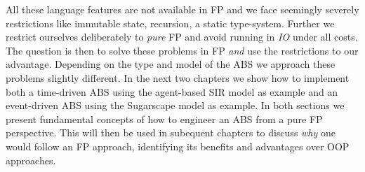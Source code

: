 All these language features are not available in FP and we face seemingly severely restrictions like immutable state, recursion, a static type-system. Further we restrict ourselves deliberately to \textit{pure} FP and avoid running in \textit{IO} under all costs. The question is then to solve these problems in FP \textit{and} use the restrictions to our advantage. Depending on the type and model of the ABS we approach these problems slightly different. In the next two chapters we show how to implement both a time-driven ABS using the agent-based SIR model as example and an event-driven ABS using the Sugarscape model as example. In both sections we present fundamental concepts of how to engineer an ABS from a pure FP perspective. This will then be used in subequent chapters to discuss \textit{why} one would follow an FP approach, identifying its benefits and advantages over OOP approaches. 